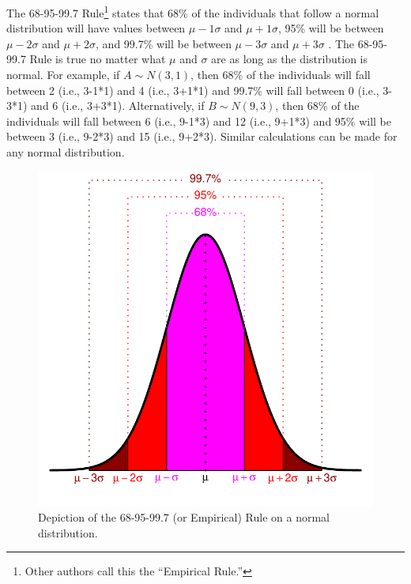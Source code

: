 \documentclass[10pt,openany]{book}\usepackage[]{graphicx}\usepackage[]{color}
\newenvironment{knitrout}{}{} %
\begin{document}
The 68-95-99.7 Rule\footnote{Other authors call this the ``Empirical Rule.''} states that 68\% of the individuals that follow a normal distribution will have values between $\mu-1\sigma$ and $\mu+1\sigma$, 95\% will be between $\mu-2\sigma$ and $\mu+2\sigma$, and 99.7\% will be between $\mu-3\sigma$ and $\mu+3\sigma$ .  The 68-95-99.7 Rule is true no matter what $\mu$ and $\sigma$ are as long as the distribution is normal.  For example, if $A\sim N(3,1)$, then 68\% of the individuals will fall between 2 (i.e., 3-1*1) and 4 (i.e., 3+1*1) and 99.7\% will fall between 0 (i.e., 3-3*1) and 6 (i.e., 3+3*1).  Alternatively, if $B\sim N(9,3)$, then 68\% of the individuals will fall between 6 (i.e., 9-1*3) and 12 (i.e., 9+1*3) and 95\% will be between 3 (i.e., 9-2*3) and 15 (i.e., 9+2*3).  Similar calculations can be made for any normal distribution.

\begin{knitrout}
\color{fgcolor}\begin{figure}[hbtp]

{\centering \includegraphics[width=.5\linewidth]{Figs/NormEmpiricalRule-1} 

}

\caption[Depiction of the 68-95-99.7 (or Empirical) Rule on a normal distribution]{Depiction of the 68-95-99.7 (or Empirical) Rule on a normal distribution.}\label{fig:NormEmpiricalRule}
\end{figure}


\end{knitrout}

\end{document}

